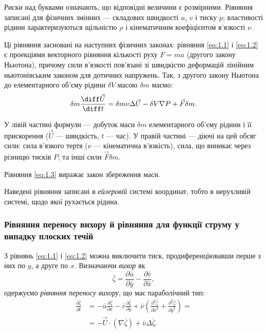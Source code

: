 \begin{remark}
    Риски над буквами означають, що відповідні величини є розмірними. Рівняння записані для фізичних змінних --- складових швидкості $u$, $v$ і тиску $p$; властивості рідини характеризуються щільністю $\rho$ і кінематичним коефіцієнтом в'язкості $\nu$.
\end{remark}
 
Ці рівняння засновані на наступних фізичних законах: рівняння \ref{eq:1.1} і \ref{eq:1.2} є проекціями векторного рівняння кількості руху $F = m a$ (другого закону Ньютона), причому сили в'язкості пов'язані зі швидкістю деформацій лінійним ньютонівським законом для дотичних напружень. Так, з другого закону Ньютона до елементарного об'єму рідини $\delta V$ масою $\delta m$ маємо:
\begin{equation}
    \delta m \frac{\diff \vec U}{\diff t} = \delta m \nu \Delta \vec U - \delta V \nabla P + \vec F \delta m.
\end{equation}
	 
У лівій частині формули --- добуток маси $\delta m$ елементарного об'єму рідини і її прискорення ($\vec U$ --- швидкість, $t$ --- час). У правій частині --- діючі на цей обсяг сили: сила в'язкого тертя ($\nu$ --- кінематична в'язкість), сила, що виникає через різницю тисків $P$, та інші сили $\vec F \delta m$.

\begin{remark}
    Рівняння \ref{eq:1.3} виражає закон збереження маси.
\end{remark}

\begin{definition}
    Наведені рівняння записані в \textit{ейлеровій} системі координат, тобто в нерухливій системі, щодо якої рухається рідина. 
\end{definition}

\subsubsection{Рівняння переносу вихору й рівняння для функції струму у випадку плоских течій}

З рівнянь \ref{eq:1.1} і \ref{eq:1.2} можна виключити тиск, продиференціювавши перше з них по $y$, а друге по $x$. Визначаючи \textit{вихор} як
\begin{equation}
    \label{eq:1.4}
    \bar \zeta = \frac{\partial \bar u}{\partial \bar y} - \frac{\partial \bar v}{\partial \bar x},
\end{equation}
одержуємо \textit{рівняння переносу вихору}, що має параболічний тип:
\begin{equation}
    \label{eq:1.5}
    \begin{aligned}
        \frac{\partial \bar \zeta}{\partial \bar t} &= -\bar u \frac{\partial \bar \zeta}{\partial \bar x} - \bar v \frac{\partial \bar \zeta}{\partial \bar y} + \bar \nu \left( \frac{\partial^2 \bar \zeta}{\partial \bar x^2} + \frac{\partial^2 \bar \zeta}{\partial \bar y^2} \right) = \\
        &= - \vec U \cdot (\nabla \bar \zeta) + \bar \nu \Delta \bar \zeta.
    \end{aligned}
\end{equation}

